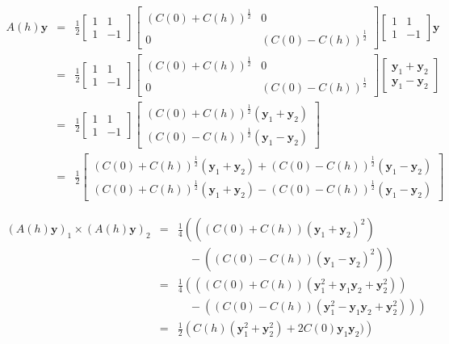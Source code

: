 \documentclass[12pt]{article}
\theoremstyle{definition}
\theoremstyle{remark}
\newcommand{\signal}{\mathbf{y}}
\begin{document}
\begin{eqnarray*}
A(h)\signal&=&\frac12\begin{bmatrix}1&1\\1&-1\end{bmatrix}\begin{bmatrix}(C(0)+C(h))^{\frac12}&0\\0&(C(0)-C(h))^{\frac12}\end{bmatrix}\begin{bmatrix}1&1\\1&-1\end{bmatrix}\signal\\
&=&\frac12\begin{bmatrix}1&1\\1&-1\end{bmatrix}\begin{bmatrix}(C(0)+C(h))^{\frac12}&0\\0&(C(0)-C(h))^{\frac12}\end{bmatrix}\begin{bmatrix}\signal_1+\signal_2\\\signal_1-\signal_2\end{bmatrix}\\
&=&\frac12\begin{bmatrix}1&1\\1&-1\end{bmatrix}\begin{bmatrix}(C(0)+C(h))^{\frac12}(\signal_1+\signal_2)\\(C(0)-C(h))^{\frac12}(\signal_1-\signal_2)\end{bmatrix}\\
&=&\frac12\begin{bmatrix}(C(0)+C(h))^{\frac12}(\signal_1+\signal_2)+(C(0)-C(h))^{\frac12}(\signal_1-\signal_2)\\(C(0)+C(h))^{\frac12}(\signal_1+\signal_2)-(C(0)-C(h))^{\frac12}(\signal_1-\signal_2)\end{bmatrix}\end{eqnarray*}

\begin{eqnarray*}
(A(h)\signal)_1\times (A(h)\signal)_2&=&
\frac14 \left(\left((C(0)+C(h))(\signal_1+\signal_2)^2\right)\right.\\
&&\quad-\left.
\left((C(0)-C(h))(\signal_1-\signal_2)^2\right)\right)\\
&=&
\frac14 \left(\left((C(0)+C(h))(\signal_1^2+\signal_1\signal_2+\signal_2^2)\right)\right.\\
&&\quad-\left.
\left((C(0)-C(h))(\signal_1^2-\signal_1\signal_2+\signal_2^2)\right)\right)\\
&=&
\frac12 \left(C(h)(\signal_1^2+\signal_2^2)+2C(0)\signal_1\signal_2)\right)

\end{eqnarray*}
\end{document}
